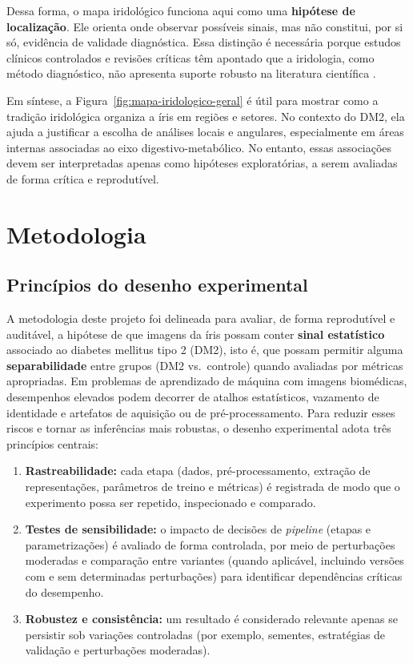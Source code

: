 \documentclass[12pt,a4paper]{article}
\begin{document}
Dessa forma, o mapa iridológico funciona aqui como uma \textbf{hipótese de localização}. Ele orienta onde observar possíveis sinais, mas não constitui, por si só, evidência de validade diagnóstica. Essa distinção é necessária porque estudos clínicos controlados e revisões críticas têm apontado que a iridologia, como método diagnóstico, não apresenta suporte robusto na literatura científica \citep{Simon1979JAMA, Knipschild1988BMJ, Ernst2000ArchOphthalmol}.

Em síntese, a Figura~\ref{fig:mapa-iridologico-geral} é útil para mostrar como a tradição iridológica organiza a íris em regiões e setores. No contexto do DM2, ela ajuda a justificar a escolha de análises locais e angulares, especialmente em áreas internas associadas ao eixo digestivo-metabólico. No entanto, essas associações devem ser interpretadas apenas como hipóteses exploratórias, a serem avaliadas de forma crítica e reprodutível.

\section{Metodologia}

\subsection{Princípios do desenho experimental}
A metodologia deste projeto foi delineada para avaliar, de forma reprodutível e auditável, a hipótese de que imagens da íris possam conter \textbf{sinal estatístico} associado ao diabetes mellitus tipo 2 (DM2), isto é, que possam permitir alguma \textbf{separabilidade} entre grupos (DM2 vs.\ controle) quando avaliadas por métricas apropriadas. Em problemas de aprendizado de máquina com imagens biomédicas, desempenhos elevados podem decorrer de atalhos estatísticos, vazamento de identidade e artefatos de aquisição ou de pré-processamento. Para reduzir esses riscos e tornar as inferências mais robustas, o desenho experimental adota três princípios centrais:

\begin{enumerate}
    \item \textbf{Rastreabilidade:} cada etapa (dados, pré-processamento, extração de representações, parâmetros de treino e métricas) é registrada de modo que o experimento possa ser repetido, inspecionado e comparado.
    \item \textbf{Testes de sensibilidade:} o impacto de decisões de \textit{pipeline} (etapas e parametrizações) é avaliado de forma controlada, por meio de perturbações moderadas e comparação entre variantes (quando aplicável, incluindo versões com e sem determinadas perturbações) para identificar dependências críticas do desempenho.
    \item \textbf{Robustez e consistência:} um resultado é considerado relevante apenas se persistir sob variações controladas (por exemplo, sementes, estratégias de validação e perturbações moderadas).
\end{enumerate}
\end{document}
